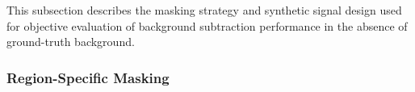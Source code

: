 \documentclass[iucr]{iucrjournals}
\begin{document}
This subsection describes the masking strategy and synthetic signal design used for objective evaluation of background subtraction performance in the absence of ground-truth background.
\subsubsection{Region-Specific Masking}






\end{document}
